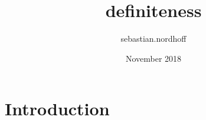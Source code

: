 \documentclass{article}
\title{definiteness}
\author{sebastian.nordhoff }
\date{November 2018}
\begin{document}
\maketitle

\section{Introduction}
\end{document}
